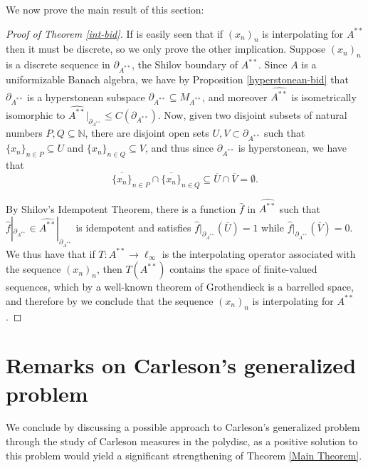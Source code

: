 \documentclass[preprint,12pt,number]{elsarticle}
\newcommand{\N}{\mathbb{N}}
\begin{document}
We now prove the main result of this section:

\begin{proof}[Proof of Theorem \ref{int-bid}]
    If is easily seen that if $(x_n)_n$ is interpolating for $A^{**}$ then it must be discrete, so we only prove the other implication. Suppose $(x_n)_n$ is a discrete sequence in $\partial_{A^{**}}$, the Shilov boundary of $A^{**}$. Since $A$ is a uniformizable Banach algebra, we have by Proposition \ref{hyperstonean-bid} that $\partial_{A^{**}}$ is a hyperstonean subspace $\partial_{A^{**}}\subseteq M_{A^{**}}$, and moreover $\widehat{A^{**}}$ is isometrically isomorphic to $\widehat{A^{**}}|_{\partial_{A^{**}}}\leq C(\partial_{A^{**}})$. Now, given two disjoint subsets of natural numbers $P,Q\subseteq\N$, there are disjoint open sets $U,V\subset \partial_{A^{**}}$ such that $\{x_n\}_{n\in P}\subseteq U$ and $\{x_n\}_{n\in Q}\subseteq V$, and thus since $\partial_{A^{**}}$ is hyperstonean, we have that 
    \[
    \overline{\{x_n\}}_{n\in P}\cap \overline{\{x_n\}}_{n\in Q}\subseteq \overline{U}\cap \overline{V}=\emptyset.
    \]
    
    By Shilov's Idempotent Theorem, there is a function $\hat{f}$ in $\widehat{A^{**}}$ such that $\hat{f}|_{\partial_{A^{**}}}\in \widehat{A^{**}}|_{\partial_{A^{**}}}$ is idempotent and satisfies $\hat{f}|_{\partial_{A^{**}}}(\overline{U})=1$ while $\hat{f}|_{\partial_{A^{**}}}(\overline{V})=0$. We thus have that if $T \colon A^{**}\rightarrow \ell_\infty$ is the interpolating operator associated with the sequence $(x_n)_n$, then $T(A^{**})$ contains the space of finite-valued sequences, which by a well-known theorem of Grothendieck is a barrelled space, and therefore by \cite{BennettKalton1973} we conclude that the sequence $(x_n)_n$ is interpolating for $A^{**}$. 
\end{proof}

\section{Remarks on Carleson's generalized problem}\label{Section-6}
\vspace{0.3cm}
We conclude by discussing a possible approach to Carleson's generalized problem through the study of Carleson measures in the polydisc, as a positive solution to this problem would yield a significant strengthening of Theorem \ref{Main Theorem}.%
\end{document}
